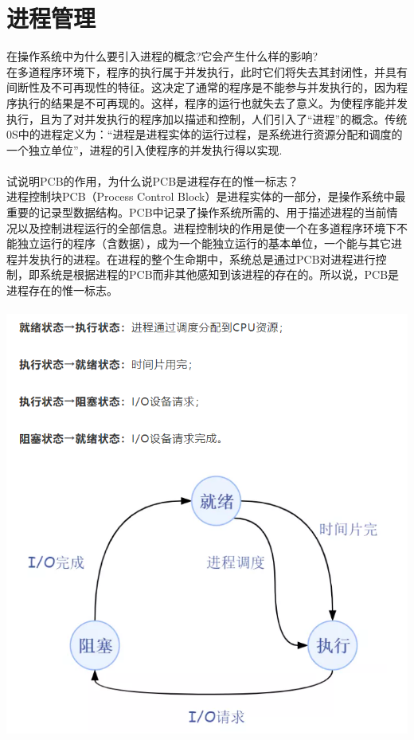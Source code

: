 \documentclass[UTF8]{article}
\begin{document}
    \section*{进程管理}
    在操作系统中为什么要引入进程的概念?它会产生什么样的影响?\\
    在多道程序环境下，程序的执行属于并发执行，此时它们将失去其封闭性，并具有间断性及不可再现性的特征。这决定了通常的程序是不能参与并发执行的，因为程序执行的结果是不可再现的。这样，程序的运行也就失去了意义。为使程序能并发执行，且为了对并发执行的程序加以描述和控制，人们引入了“进程”的概念。传统0S中的进程定义为：“进程是进程实体的运行过程，是系统进行资源分配和调度的一个独立单位”，进程的引入使程序的并发执行得以实现.\\
    \\
    试说明PCB的作用，为什么说PCB是进程存在的惟一标志？\\
    进程控制块PCB（Process Control Block）是进程实体的一部分，是操作系统中最重要的记录型数据结构。PCB中记录了操作系统所需的、用于描述进程的当前情况以及控制进程运行的全部信息。进程控制块的作用是使一个在多道程序环境下不能独立运行的程序（含数据），成为一个能独立运行的基本单位，一个能与其它进程并发执行的进程。在进程的整个生命期中，系统总是通过PCB对进程进行控制，即系统是根据进程的PCB而非其他感知到该进程的存在的。所以说，PCB是进程存在的惟一标志。\\
    \\
    \includegraphics{graph/1.png}
\end{document}
